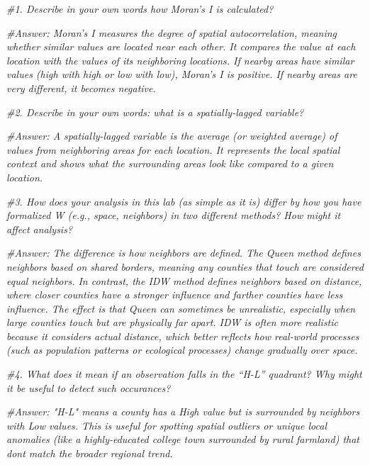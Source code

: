 \documentclass[
]{article}
\newenvironment{Shaded}{\begin{snugshade}}{\end{snugshade}}
\newcommand{\CommentTok}[1]{\textcolor[rgb]{0.56,0.35,0.01}{\textit{#1}}}
\begin{document}
\begin{Shaded}
\begin{Highlighting}[]
\CommentTok{\#1. Describe in your own words how Moran’s I is calculated? }

\CommentTok{\#Answer: Moran’s I measures the degree of spatial autocorrelation, meaning whether similar values are located near each other. It compares the value at each location with the values of its neighboring locations. If nearby areas have similar values (high with high or low with low), Moran’s I is positive. If nearby areas are very different, it becomes negative.}

\CommentTok{\#2. Describe in your own words: what is a spatially{-}lagged variable? }

\CommentTok{\#Answer: A spatially{-}lagged variable is the average (or weighted average) of values from neighboring areas for each location. It represents the local spatial context and shows what the surrounding areas look like compared to a given location.}

\CommentTok{\#3. How does your analysis in this lab (as simple as it is) differ by how you have formalized W (e.g., space, neighbors) in two diﬀerent methods? How might it affect analysis? }

\CommentTok{\#Answer: The difference is how neighbors are defined. The Queen method defines neighbors based on shared borders, meaning any counties that touch are considered equal neighbors. In contrast, the IDW method defines neighbors based on distance, where closer counties have a stronger influence and farther counties have less influence. The effect is that Queen can sometimes be unrealistic, especially when large counties touch but are physically far apart. IDW is often more realistic because it considers actual distance, which better reflects how real{-}world processes (such as population patterns or ecological processes) change gradually over space.}

\CommentTok{\#4. What does it mean if an observation falls in the “H{-}L” quadrant? Why might it be useful to detect such occurances? }

\CommentTok{\#Answer: "H{-}L" means a county has a High value but is surrounded by neighbors with Low values. This is useful for spotting spatial outliers or unique local anomalies (like a highly{-}educated college town surrounded by rural farmland) that don\textquotesingle{}t match the broader regional trend.}
\end{Highlighting}
\end{Shaded}
\end{document}
